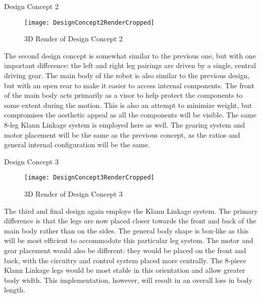 \begin{homeworkProblem}
\begin{homeworkSection}{Design Concept 2}
\begin{figure}[H]
  \begin{center}
    \texttt{[image: DesignConcept2RenderCropped]}
    \caption{3D Render of Design Concept 2}
    \label{3dConcept2}
  \end{center}
\end{figure}

The second design concept is somewhat similar to the previous one, but with one important difference: the left and right leg pairings are driven by a single, central driving gear. The main body of the robot is also similar to the previous design, but with an open rear to make it easier to access internal components. The front of the main body acts primarily as a visor to help protect the components to some extent during the motion. This is also an attempt to minimize weight, but compromises the aesthetic appeal as all the components will be visible. The same 8-leg Klann Linkage system is employed here as well. The gearing system and motor placement will be the same as the previous concept, as the ratios and general internal configuration will be the same.

\end{homeworkSection}

\begin{homeworkSection}{Design Concept 3}

\begin{figure}[H]
  \begin{center}
    \texttt{[image: DesignConcept3RenderCropped]}
    \caption{3D Render of Design Concept 3}
    \label{3dConcept3}
  \end{center}
\end{figure}

The third and final design again employs the Klann Linkage system. The primary difference is that the legs are now placed closer towards the front and back of the main body rather than on the sides. The general body shape is box-like as this will be most efficient to accommodate this particular leg system. The motor and gear placement would also be different: they would be placed on the front and back, with the circuitry and control system placed more centrally. The 8-piece Klann Linkage legs would be most stable in this orientation and allow greater body width. This implementation, however, will result in an overall loss in body length.

\end{homeworkSection}
\end{homeworkProblem}


